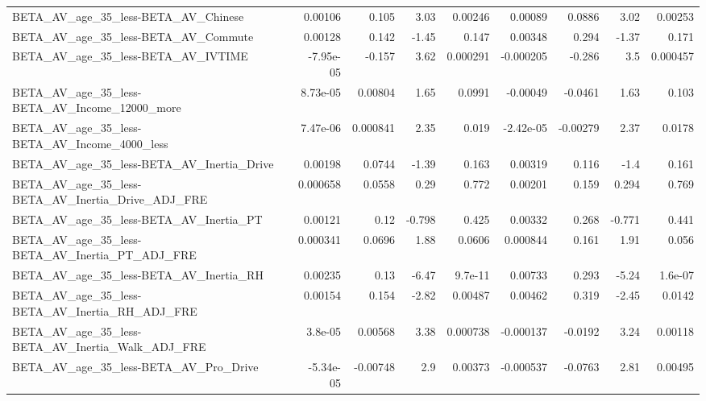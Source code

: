 \begin{tabular}{lrrrrrrrr}
BETA\_AV\_age\_35\_less-BETA\_AV\_Chinese                &     0.00106 &        0.105 &     3.03 &  0.00246 &    0.00089 &      0.0886 &         3.02 &       0.00253 \\
BETA\_AV\_age\_35\_less-BETA\_AV\_Commute                &     0.00128 &        0.142 &    -1.45 &    0.147 &    0.00348 &       0.294 &        -1.37 &         0.171 \\
BETA\_AV\_age\_35\_less-BETA\_AV\_IVTIME                 &   -7.95e-05 &       -0.157 &     3.62 & 0.000291 &  -0.000205 &      -0.286 &          3.5 &      0.000457 \\
BETA\_AV\_age\_35\_less-BETA\_AV\_Income\_12000\_more      &    8.73e-05 &      0.00804 &     1.65 &   0.0991 &   -0.00049 &     -0.0461 &         1.63 &         0.103 \\
BETA\_AV\_age\_35\_less-BETA\_AV\_Income\_4000\_less       &    7.47e-06 &     0.000841 &     2.35 &    0.019 &  -2.42e-05 &    -0.00279 &         2.37 &        0.0178 \\
BETA\_AV\_age\_35\_less-BETA\_AV\_Inertia\_Drive          &     0.00198 &       0.0744 &    -1.39 &    0.163 &    0.00319 &       0.116 &         -1.4 &         0.161 \\
BETA\_AV\_age\_35\_less-BETA\_AV\_Inertia\_Drive\_ADJ\_FRE  &    0.000658 &       0.0558 &     0.29 &    0.772 &    0.00201 &       0.159 &        0.294 &         0.769 \\
BETA\_AV\_age\_35\_less-BETA\_AV\_Inertia\_PT             &     0.00121 &         0.12 &   -0.798 &    0.425 &    0.00332 &       0.268 &       -0.771 &         0.441 \\
BETA\_AV\_age\_35\_less-BETA\_AV\_Inertia\_PT\_ADJ\_FRE     &    0.000341 &       0.0696 &     1.88 &   0.0606 &   0.000844 &       0.161 &         1.91 &         0.056 \\
BETA\_AV\_age\_35\_less-BETA\_AV\_Inertia\_RH             &     0.00235 &         0.13 &    -6.47 &  9.7e-11 &    0.00733 &       0.293 &        -5.24 &       1.6e-07 \\
BETA\_AV\_age\_35\_less-BETA\_AV\_Inertia\_RH\_ADJ\_FRE     &     0.00154 &        0.154 &    -2.82 &  0.00487 &    0.00462 &       0.319 &        -2.45 &        0.0142 \\
BETA\_AV\_age\_35\_less-BETA\_AV\_Inertia\_Walk\_ADJ\_FRE   &     3.8e-05 &      0.00568 &     3.38 & 0.000738 &  -0.000137 &     -0.0192 &         3.24 &       0.00118 \\
BETA\_AV\_age\_35\_less-BETA\_AV\_Pro\_Drive              &   -5.34e-05 &     -0.00748 &      2.9 &  0.00373 &  -0.000537 &     -0.0763 &         2.81 &       0.00495 \\

\end{tabular}
